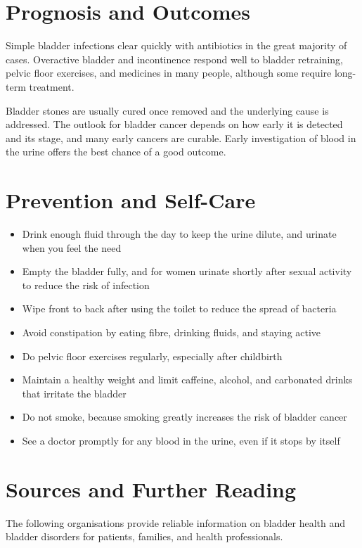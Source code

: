 \section*{Prognosis and Outcomes}
Simple bladder infections clear quickly with antibiotics in the great majority of cases. Overactive bladder and incontinence respond well to bladder retraining, pelvic floor exercises, and medicines in many people, although some require long-term treatment.

Bladder stones are usually cured once removed and the underlying cause is addressed. The outlook for bladder cancer depends on how early it is detected and its stage, and many early cancers are curable. Early investigation of blood in the urine offers the best chance of a good outcome.

\section*{Prevention and Self-Care}
\begin{itemize}
    \item Drink enough fluid through the day to keep the urine dilute, and urinate when you feel the need
    \item Empty the bladder fully, and for women urinate shortly after sexual activity to reduce the risk of infection
    \item Wipe front to back after using the toilet to reduce the spread of bacteria
    \item Avoid constipation by eating fibre, drinking fluids, and staying active
    \item Do pelvic floor exercises regularly, especially after childbirth
    \item Maintain a healthy weight and limit caffeine, alcohol, and carbonated drinks that irritate the bladder
    \item Do not smoke, because smoking greatly increases the risk of bladder cancer
    \item See a doctor promptly for any blood in the urine, even if it stops by itself
\end{itemize}

\section*{Sources and Further Reading}
The following organisations provide reliable information on bladder health and bladder disorders for patients, families, and health professionals.

